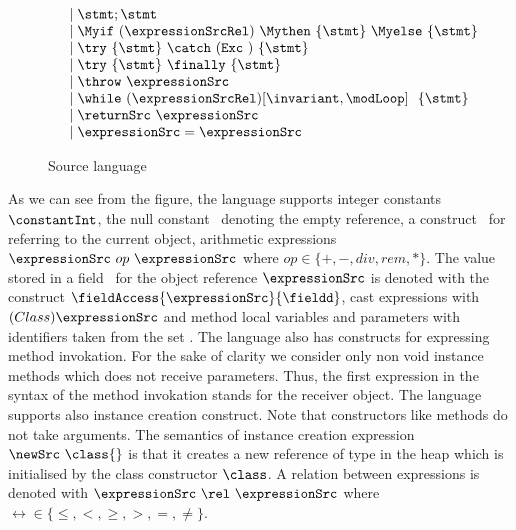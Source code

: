 \begin{figure}[ht!]
\begin{frameit}
$$\begin{array} {ll}
                                & \mid \stmt;\stmt \\
                                & \mid \Myif \ (\expressionSrcRel) \ \Mythen \ \{ \stmt \} \  \Myelse \ \{ \stmt \}  \\
			        & \mid \try  \ \{ \stmt \}  \ \catch \ ( \mbox{\rm\texttt{Exc} } )\ \{ \stmt \} \\
		                & \mid \try  \ \{ \stmt \} \ \finally \ \{ \stmt \} \\
				& \mid \throw \ \expressionSrc  \\
                                & \mid \while \ (\expressionSrcRel) \lbrack \invariant, \modLoop \rbrack \ \do \ \{ \stmt \}\ \\
				& \mid \returnSrc \  \expressionSrc \\
                   		& \mid \expressionSrc = \expressionSrc \\        
    \end{array} $$
\caption{\sc Source language}
\label{source:grammar}
\end{frameit}
\end{figure}


    As we can see from the figure, the language supports 
    integer constants $\constantInt$, the null constant \Mynull \ 
    denoting  the empty reference, a construct \this \ for referring to the current object,  
    arithmetic expressions  $\expressionSrc \ op \ \expressionSrc$ where $op \in  \{+ , - , div , rem, * \}$.
    The value stored in a field \fieldd \ for the object reference $\expressionSrc $ is denoted with
    the construct  $ \fieldAccess{\expressionSrc}{\fieldd} $, cast expressions with   $(Class) \expressionSrc$
    and method local variables  and parameters with identifiers taken from the set \var.  
    The language also has constructs for expressing method invokation.  For the sake of clarity we consider only non void  instance  methods which does not 
    receive parameters.
    Thus, the first expression in the syntax of the method invokation stands for the receiver object.  
    The language supports also instance creation construct. Note that constructors like methods do not take arguments.
    The semantics of instance creation expression $\newSrc \ \class{}$  is that it 
    creates a new reference of type \class{} in the heap  which is initialised by the class constructor $\class$.
    A relation between    expressions is denoted with
    $\expressionSrc \ \rel \ \expressionSrc $ where $\rel  \in \{ \le, < ,  \ge, >, = , \neq \}$.
  
